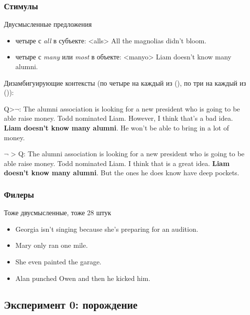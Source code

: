 \documentclass{beamer}
\begin{document}
\begin{frame}
    \frametitle{Стимулы}
    
    Двусмысленные предложения
    
    \begin{itemize}
        \item четыре с \textit{all} в субъекте:
        \ex<alls>
        All the magnolias didn't bloom.
        \xe
        
        \item четыре с \textit{many} или \textit{most} в объекте:
        \ex<manyo>
        Liam doesn't know many alumni.
        \xe
    \end{itemize}
    
    \pause
    
    Дизамбигуирующие контексты (по четыре на каждый из (), по три на каждый из ()):
    
    Q>$\neg$:
    {\small The alumni association is looking for a new president who is going to be
    able raise money. Todd nominated Liam. However, I think that’s a bad
    idea. \textbf{Liam doesn’t know many alumni}. He won’t be able to bring in a
    lot of money.}
    
    $\neg$ > Q:
    {\small The alumni association is looking for a new president who is going to be
    able raise money. Todd nominated Liam. I think that is a great idea. \textbf{Liam
    doesn’t know many alumni}. But the ones he does know have deep
    pockets.}

\end{frame}

\begin{frame}
    \frametitle{Филеры}
    
    Тоже двусмысленные, тоже 28 штук
    
    \begin{itemize}
        \item  Georgia isn’t singing because she’s preparing for an audition.
        \item  Mary only ran one mile.
        \item  She even painted the garage.
        \item  Alan punched Owen and then he kicked him.
    \end{itemize}
    
\end{frame}

\subsection{Эксперимент 0: порождение}
\end{document}
